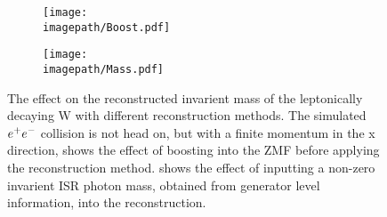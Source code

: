 \begin{figure}
  \centering
  \begin{subfigure}[t]{0.45\textwidth}
    \centering
    \texttt{[image: \\imagepath/Boost.pdf]}
    \caption{}
    \label{SUBFIG:Boost}
  \end{subfigure}
  \begin{subfigure}[t]{0.45\textwidth}
    \centering
    \texttt{[image: \\imagepath/Mass.pdf]}
    \caption{}
    \label{SUBFIG:MassFig}
  \end{subfigure}
  \caption{
    The effect on the reconstructed invarient mass of the leptonically decaying W with different reconstruction methods.
    The simulated $e^{+}e^{-}$ collision is not head on, but with a finite momentum in the x direction,  shows the effect of boosting into the ZMF before applying the reconstruction method.
     shows the effect of inputting a non-zero invarient ISR photon mass, obtained from generator level information, into the reconstruction.
    }
  \label{FIG:BoostMass}
\end{figure}

